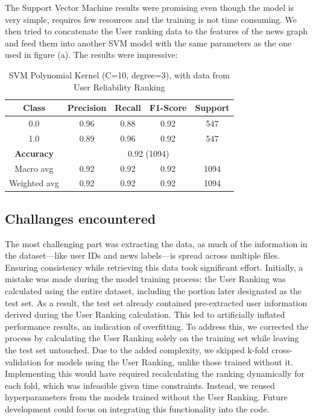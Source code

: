\documentclass[11pt,a4paper]{article}
\begin{document}
\newpage

The Support Vector Machine results were promising even though the model is very simple, requires few resources and the training is not time consuming. We then tried to concatenate the User ranking data to the features of the news graph and feed them into another SVM model with the same parameters as the one used in figure (a). The results were impressive:

\begin{table}[ht]
\centering
\begin{tabular}{|c|c|c|c|c|}
\hline
Class & Precision & Recall & F1-Score & Support \\
\hline
0.0    & 0.96      & 0.88   & 0.92     & 547     \\
1.0    & 0.89      & 0.96   & 0.92     & 547     \\
\hline
\textbf{Accuracy}   & \multicolumn{4}{c|}{0.92 (1094)} \\
\hline
Macro avg           & 0.92      & 0.92   & 0.92     & 1094    \\
Weighted avg        & 0.92      & 0.92   & 0.92     & 1094    \\
\hline
\end{tabular}
\caption{SVM Polynomial Kernel (C=10, degree=3), with data from User Reliability Ranking}
\end{table}
\subsection*{Challanges encountered}
The most challenging part was extracting the data, as much of the information in the dataset—like user IDs and news labels—is spread across multiple files. Ensuring consistency while retrieving this data took significant effort. Initially, a mistake was made during the model training process: the User Ranking was calculated using the entire dataset, including the portion later designated as the test set. As a result, the test set already contained pre-extracted user information derived during the User Ranking calculation. This led to artificially inflated performance results, an indication of overfitting. To address this, we corrected the process by calculating the User Ranking solely on the training set while leaving the test set untouched. Due to the added complexity, we skipped k-fold cross-validation for models using the User Ranking, unlike those trained without it. Implementing this would have required recalculating the ranking dynamically for each fold, which was infeasible given time constraints. Instead, we reused hyperparameters from the models trained without the User Ranking. Future development could focus on integrating this functionality into the code.
\end{document}
